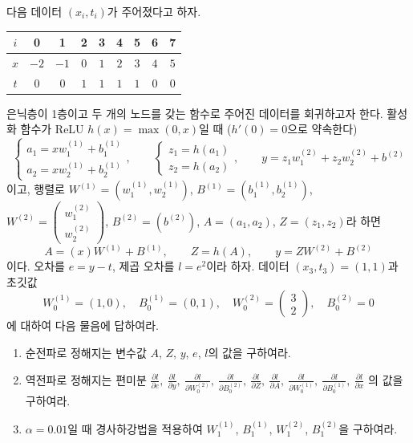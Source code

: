 \documentclass[11pt,a4paper]{article}
\newcommand{\pd}[2]{\frac{\partial #1}{\partial #2}}
\begin{document}
\begin{problems}
다음 데이터 $(x_i,t_i)$가 주어졌다고 하자.
\begin{center}
\begin{tabular}{c|cccccccc}
\toprule
$i$ & 0 & 1 & 2 & 3 & 4 & 5 & 6 & 7 \\
\midrule
$x$ & $-2$ & $-1$ & $0$ & $1$ & $2$ & $3$ & $4$ & $5$ \\
$t$ & $0$ & $0$ & $1$ & $1$ & $1$ & $1$ & $0$ & $0$ \\
\bottomrule
\end{tabular}
\end{center}
은닉층이 1층이고 두 개의 노드를 갖는 함수로 주어진 데이터를 회귀하고자 한다.
활성화 함수가 ReLU $h(x)=\max(0,x)$일 때 ($h'(0)=0$으로 약속한다)
\[
\begin{cases}a_1=xw^{(1)}_1+b^{(1)}_1\\ a_2=xw^{(1)}_2+b^{(1)}_2\end{cases},\qquad
\begin{cases}z_1=h(a_1)\\ z_2=h(a_2)\end{cases},\qquad
y=z_1w^{(2)}_1+z_2w^{(2)}_2+b^{(2)}
\]
이고, 행렬로 $W^{(1)}=(w^{(1)}_1,w^{(1)}_2)$, $B^{(1)}=(b^{(1)}_1,b^{(1)}_2)$,
$W^{(2)}=\begin{pmatrix}w^{(2)}_1\\ w^{(2)}_2\end{pmatrix}$, $B^{(2)}=(b^{(2)})$, $A=(a_1,a_2)$, $Z=(z_1,z_2)$라 하면
\[
A=(x)W^{(1)}+B^{(1)},\qquad Z=h(A),\qquad y=ZW^{(2)}+B^{(2)}
\]
이다. 오차를 $e=y-t$, 제곱 오차를 $l=e^2$이라 하자.
데이터 $(x_3,t_3)=(1,1)$과 초깃값
\[
W^{(1)}_0=(1,0),\quad B^{(1)}_0=(0,1),\quad W^{(2)}_0=\begin{pmatrix}3\\2\end{pmatrix},\quad B^{(2)}_0=0
\]
에 대하여 다음 물음에 답하여라.

\begin{enumerate}[label=(\alph*),leftmargin=2em]
\item 순전파로 정해지는 변수값 $A$, $Z$, $y$, $e$, $l$의 값을 구하여라.
\item 역전파로 정해지는 편미분
$\pd{l}{e},\ \pd{l}{y},\ \pd{l}{W^{(2)}_0},\ \pd{l}{B^{(2)}_0},\ \pd{l}{Z},\ \pd{l}{A},\ \pd{l}{W^{(1)}_0},\ \pd{l}{B^{(1)}_0},\ \pd{l}{x}$
의 값을 구하여라.
\item $\alpha=0.01$일 때 경사하강법을 적용하여 $W^{(1)}_1$, $B^{(1)}_1$, $W^{(2)}_1$, $B^{(2)}_1$을 구하여라.

\end{enumerate}

\end{problems}
\end{document}
